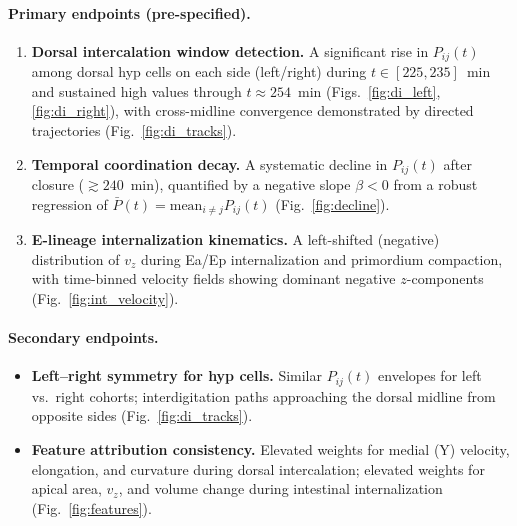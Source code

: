 \documentclass[unnumsec,webpdf,modern,large,namedate]{oup-authoring-template}%
\theoremstyle{thmstyleone}\newtheorem{theorem}{Theorem}
\theoremstyle{thmstyletwo}\newtheorem{example}{Example}
\theoremstyle{thmstylethree}\newtheorem{definition}{Definition}
\begin{document}
\paragraph{Primary endpoints (pre-specified).}
\begin{enumerate}
\item \textbf{Dorsal intercalation window detection.} A significant rise in $P_{ij}(t)$ among dorsal hyp cells on each side (left/right) during $t\in[225,235]$~min and sustained high values through $t\approx 254$~min (Figs.~\ref{fig:di_left},\ref{fig:di_right}), with cross-midline convergence demonstrated by directed trajectories (Fig.~\ref{fig:di_tracks}).
\item \textbf{Temporal coordination decay.} A systematic decline in $P_{ij}(t)$ after closure ($\gtrsim 240$~min), quantified by a negative slope $\beta<0$ from a robust regression of $\bar{P}(t)=\mathrm{mean}_{i\neq j}P_{ij}(t)$ (Fig.~\ref{fig:decline}).
\item \textbf{E-lineage internalization kinematics.} A left-shifted (negative) distribution of $v_z$ during Ea/Ep internalization and primordium compaction, with time-binned velocity fields showing dominant negative $z$-components (Fig.~\ref{fig:int_velocity}).
\end{enumerate}

\paragraph{Secondary endpoints.}
\begin{itemize}
\item \textbf{Left--right symmetry for hyp cells.} Similar $P_{ij}(t)$ envelopes for left vs.~right cohorts; interdigitation paths approaching the dorsal midline from opposite sides (Fig.~\ref{fig:di_tracks}).
\item \textbf{Feature attribution consistency.} Elevated weights for medial (Y) velocity, elongation, and curvature during dorsal intercalation; elevated weights for apical area, $v_z$, and volume change during intestinal internalization (Fig.~\ref{fig:features}).
\end{itemize}
\end{document}
